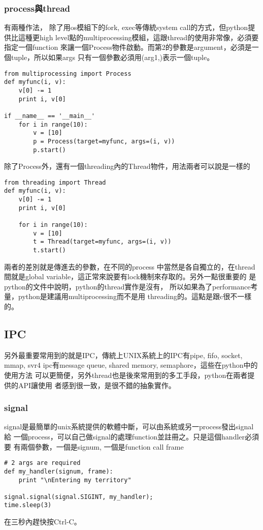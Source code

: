   \subsubsection{process與thread}
    有兩種作法，
    除了用os模組下的fork, exec等傳統system call的方式，但python提供比這種更high
    level點的multiprocessing模組，這跟thread的使用非常像，必須要指定一個function
    來讓一個Process物件啟動。而第2的參數是argument，必須是一個tuple，所以如果args
    只有一個參數必須用(arg1,)表示一個tuple。
    \begin{verbatim}
from multiprocessing import Process
def myfunc(i, v):
    v[0] -= 1
    print i, v[0]

if __name__ == '__main__'
    for i in range(10):
        v = [10]
        p = Process(target=myfunc, args=(i, v))
        p.start()
    \end{verbatim}
    除了Process外，還有一個threading內的Thread物件，用法兩者可以說是一樣的
    \begin{verbatim}
from threading import Thread
def myfunc(i, v):
    v[0] -= 1
    print i, v[0]

    for i in range(10):
        v = [10]
        t = Thread(target=myfunc, args=(i, v))
        t.start()
    \end{verbatim}
    兩者的差別就是傳進去的參數，在不同的process 中當然是各自獨立的，在thread
    間就是global variable，這正常來說要有lock機制來存取的。另外一點很重要的
    是python的文件中說明，python的thread實作是沒有，
    所以如果為了performance考量，python是建議用multiprocessing而不是用
    threading的。這點是跟c很不一樣的。

  \subsection{IPC}
  另外最重要常用到的就是IPC，傳統上UNIX系統上的IPC有pipe, fifo, socket, mmap,
  svr4 ipc有message queue, shared memory, semaphore，這些在python中的使用方法
  可以更簡便，另外thread也是後來常用到的多工手段，python在兩者提供的API讓使用
  者感到很一致，是很不錯的抽象實作。

  \subsubsection{signal}
  signal是最簡單的unix系統提供的軟體中斷，可以由系統或另一process發出signal給
  一個process，可以自己做signal的處理function並註冊之。只是這個handler必須要
  有兩個參數，一個是signum, 一個是function call frame
  \begin{verbatim}
# 2 args are required
def my_handler(signum, frame):
    print "\nEntering my territory"

signal.signal(signal.SIGINT, my_handler);
time.sleep(3)
  \end{verbatim}
  在三秒內趕快按Ctrl-C。

